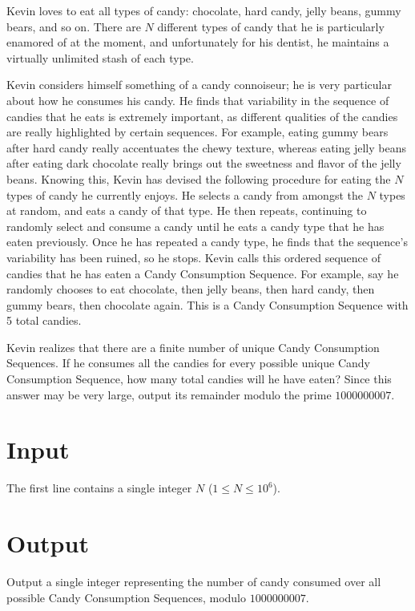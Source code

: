 
Kevin loves to eat all types of candy: chocolate, hard candy, jelly beans, gummy bears, and so on.
There are $N$ different types of candy that he is particularly enamored of at the moment, and unfortunately
for his dentist, he maintains a virtually unlimited stash of each type.

Kevin considers himself something of a candy connoiseur; he is very particular about how he consumes his
candy. He finds that variability in the sequence of candies that he eats is extremely important, as
different qualities of the candies are really highlighted by certain sequences. For example, eating gummy
bears after hard candy really accentuates the chewy texture, whereas eating jelly beans after eating dark
chocolate really brings out the sweetness and flavor of the jelly beans. Knowing this, Kevin has devised the
following procedure for eating the $N$ types of candy he currently enjoys. He selects a candy from amongst
the $N$ types at random, and eats a candy of that type. He then repeats, continuing to randomly select and
consume a candy until he eats a candy type that he has eaten previously. Once he has repeated a candy
type, he finds that the sequence's variability has been ruined, so he stops. Kevin calls this ordered
sequence of candies that he has eaten a Candy Consumption Sequence. For example, say he randomly chooses
to eat chocolate, then jelly beans, then hard candy, then gummy bears, then chocolate again. This is a
Candy Consumption Sequence with 5 total candies.

Kevin realizes that there are a finite number of unique Candy Consumption Sequences. If he consumes all the
candies for every possible unique Candy Consumption Sequence, how many total candies will he have eaten? 
Since this answer may be very large, output its remainder modulo the prime $1000000007$.

\section*{Input}
The first line contains a single integer $N$ ($1 \leq N \leq 10^6$).

\section*{Output}
Output a single integer representing the number of candy consumed over all possible Candy Consumption
Sequences, modulo $1000000007$.
